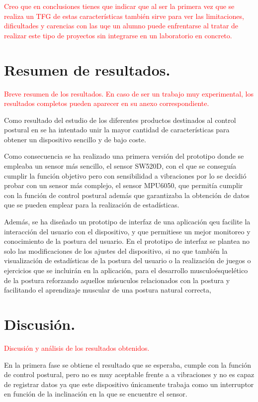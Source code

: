 \textcolor{red}{Creo que en conclusiones tienes que indicar que al ser la primera vez que se realiza un TFG de estas características también sirve para ver las limitaciones, dificultades y carencias con las uqe un alumno puede enfrentarse al tratar de realizar este tipo de proyectos sin integrarse en un laboratorio en concreto. }


\section{Resumen de resultados.}

\textcolor{red}{Breve resumen de los resultados. En caso de ser un trabajo muy experimental, los resultados completos pueden aparecer en su anexo correspondiente.}

Como resultado del estudio de los diferentes productos destinados al control postural en se ha intentado unir la mayor cantidad de características para obtener un dispositivo sencillo y de bajo coste.

Como consecuencia se ha realizado una primera versión del prototipo donde se empleaba un sensor más sencillo, el sensor SW520D, con el que se conseguía cumplir la función objetivo pero con sensibilidad a vibraciones por lo se decidió probar con un sensor más complejo, el sensor MPU6050, que permitía cumplir con la función de control postural además que garantizaba la obtención de datos que se pueden emplear para la realización de estadísticas.

Además, se ha diseñado un prototipo de interfaz de una aplicación qeu facilite la interacción del usuario con el dispositivo, y que permitiese un mejor monitoreo y conocimiento de la postura del usuario. En el prototipo de interfaz se plantea no solo las modificaciones de los ajustes del dispositivo, si no que también la visualización de estadísticas de la postura del usuario o la realización de juegos o ejercicios que se incluirán en la aplicación, para el desarrollo musculoésquelético de la postura reforzando aquellos músuculos relacionados con la postura y facilitando el aprendizaje muscular de una postura natural correcta, 

\section{Discusión.}
\textcolor{red}{Discusión y análisis de los resultados obtenidos.}

En la primera fase se obtiene el resultado que se esperaba, cumple con la función de control postural, pero no es muy aceptable frente a a vibraciones y no es capaz de registrar datos ya que este dispositivo únicamente trabaja como un interruptor en función de la inclinación en la que se encuentre el sensor.

